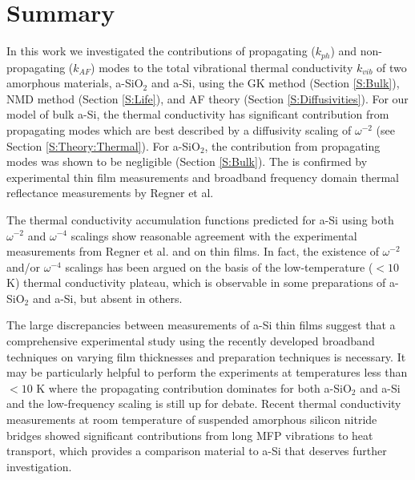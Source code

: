 \documentclass[aps,prb,onecolumn,preprint,superscriptaddress,footinbib,amsmath,amssymb,floatfix]{revtex4}
\begin{document}
\section{\label{S:Lifetimes}Summary}

In this work we investigated the contributions of propagating ($k_{ph}$) 
and non-propagating ($k_{AF}$) modes to the total vibrational 
thermal conductivity $k_{vib}$ of two amorphous materials, 
a-SiO$_2$ and a-Si, using the GK method (Section \ref{S:Bulk}), 
NMD method (Section \ref{S:Life}),  
and AF theory (Section \ref{S:Diffusivities}). 
For our model of bulk a-Si, 
the thermal conductivity has  
significant contribution from propagating modes which are best 
described by a diffusivity scaling of $\omega^{-2}$ 
(see Section \ref{S:Theory:Thermal}).  
For a-SiO$_2$, the contribution from propagating modes was shown to 
be negligible (Section \ref{S:Bulk}). 
The is confirmed by experimental thin film measurements
\cite{love_estimate_1990,baldi_thermal_2008} 
and broadband frequency domain thermal reflectance measurements  
by Regner et al.\cite{regner_broadband_2013} 

The thermal conductivity accumulation functions predicted for a-Si 
using both $\omega^{-2}$ 
and $\omega^{-4}$ scalings show reasonable agreement 
with the experimental measurements from Regner et al.
\cite{regner_broadband_2013} and on thin films.
\cite{feldman_thermal_1993,cahill_thermal_1994,
feldman_numerical_1999,liu_high_2009,yang_anomalously_2010} 
In fact, the existence of $\omega^{-2}$ and/or $\omega^{-4}$ 
scalings has been argued on the basis of the low-temperature 
($< 10$ K)
thermal conductivity plateau,
\cite{freeman_thermal_1986,feldman_thermal_1993,
feldman_numerical_1999} 
which is observable in some preparations of a-SiO$_2$
\cite{zeller_thermal_1971,freeman_thermal_1986,
cahill_lattice_1988,cahill_heat_1989} 
and a-Si\cite{pompe_thermal_1988,liu_high_2009}, 
but absent in others.
\cite{zink_excess_2006,zink_thermal_2006,liu_high_2009} 

The large discrepancies between measurements of 
a-Si thin films suggest that a comprehensive 
experimental study using the recently developed broadband 
techniques\cite{koh_frequency_2007,
minnich_thermal_2011,regner_broadband_2013} on varying film 
thicknesses and preparation techniques is necessary.  
It may be particularly helpful to perform the experiments 
at temperatures less than $< 10$ K where the propagating contribution 
dominates for both a-SiO$_2$ and a-Si and the low-frequency scaling 
is still up for debate.\cite{freeman_thermal_1986,
cahill_lattice_1988,cahill_thermal_1989,
love_estimate_1990,feldman_thermal_1993,cahill_thermal_1994,
feldman_numerical_1999,baldi_thermal_2008,liu_high_2009,
yang_anomalously_2010} 
Recent thermal conductivity measurements at room temperature 
of suspended amorphous silicon nitride bridges showed significant 
contributions from long MFP 
vibrations to heat transport,\cite{sultan_heat_2013} 
which provides a comparison material to a-Si that deserves further 
investigation. 
\end{document}
